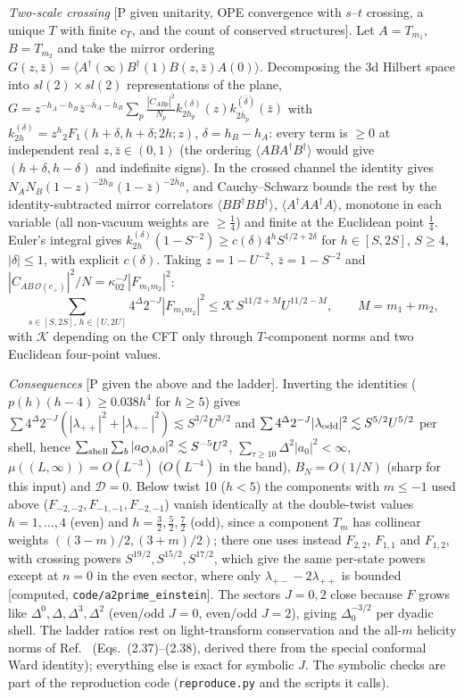 \documentclass[aps,prl,onecolumn,superscriptaddress,nofootinbib]{revtex4-2}
\begin{document}
\emph{Two-scale crossing} [P given unitarity, OPE convergence with $s$--$t$ crossing, a unique $T$ with finite $c_T$, and
the count of conserved structures]. Let $A=T_{m_1}$, $B=T_{m_2}$ and take the mirror ordering
$G(z,\bar z)=\langle A^\dagger(\infty)B^\dagger(1)B(z,\bar z)A(0)\rangle$. Decomposing the 3d Hilbert space into
$sl(2)\times sl(2)$ representations of the plane, $G=z^{-h_A-h_B}\bar z^{-\bar h_A-\bar h_B}\sum_p\frac{|C_{ABp}|^2}{N_p}
k^{(\delta)}_{2h_p}(z)k^{(\bar\delta)}_{2\bar h_p}(\bar z)$ with $k^{(\delta)}_{2h}=z^h{}_2F_1(h+\delta,h+\delta;2h;z)$,
$\delta=h_B-h_A$: every term is $\ge0$ at independent real $z,\bar z\in(0,1)$ (the ordering $\langle ABA^\dagger B^\dagger\rangle$
would give $(h+\delta,h-\delta)$ and indefinite signs). In the crossed channel the identity gives
$N_AN_B(1-z)^{-2h_B}(1-\bar z)^{-2\bar h_B}$, and Cauchy--Schwarz bounds the rest by the identity-subtracted mirror
correlators $\langle BB^\dagger BB^\dagger\rangle$, $\langle A^\dagger AA^\dagger A\rangle$, monotone in each variable
(all non-vacuum weights are $\ge\frac14$) and finite at the Euclidean point $\frac14$. Euler's integral gives
$k^{(\delta)}_{2h}(1-S^{-2})\ge c(\delta)4^hS^{1/2+2\delta}$ for $h\in[S,2S]$, $S\ge4$, $|\delta|\le1$, with explicit
$c(\delta)$. Taking $z=1-U^{-2}$, $\bar z=1-S^{-2}$ and $|C_{AB\,\mathcal O(e_+)}|^2/N=\kappa_02^{-J}|F_{m_1m_2}|^2$:
\[
\sum_{s\in[S,2S],\,h\in[U,2U]}4^\Delta2^{-J}|F_{m_1m_2}|^2\le\mathcal K\,S^{11/2+M}U^{11/2-M},\qquad M=m_1+m_2 ,
\]
with $\mathcal K$ depending on the CFT only through $T$-component norms and two Euclidean four-point values.

\emph{Consequences} [P given the above and the ladder]. Inverting the identities ($p(h)(h-4)\ge0.038h^4$ for $h\ge5$)
gives $\sum4^\Delta2^{-J}(|\lambda_{++}|^2+|\lambda_{+-}|^2)\lesssim S^{3/2}U^{3/2}$ and
$\sum4^\Delta2^{-J}|\lambda_{\rm odd}|^2\lesssim S^{5/2}U^{5/2}$ per shell, hence $\sum_{\rm shell}\sum_b|a_{\mathcal O,b,0}|^2
\lesssim S^{-5}U^2$, $\sum_{\tau\ge10}\Delta^2|a_0|^2<\infty$, $\mu((L,\infty))=O(L^{-3})$ ($O(L^{-4})$ in the band),
$B_N=O(1/N)$ (sharp for this input) and $\mathcal D=0$. Below twist 10 ($h<5$) the components with $m\le-1$ used above ($F_{-2,-2},F_{-1,-1},F_{-2,-1}$) vanish identically at the double-twist values $h=1,\dots,4$ (even) and $h=\tfrac32,\tfrac52,\tfrac72$ (odd), since a component $T_m$ has collinear weights $((3-m)/2,(3+m)/2)$; there one uses instead $F_{2,2}$, $F_{1,1}$ and $F_{1,2}$, with crossing powers $S^{19/2},S^{15/2},S^{17/2}$, which give the same per-state powers except at $n=0$ in the even sector, where only $\lambda_{+-}-2\lambda_{++}$ is bounded [computed, \texttt{code/a2prime\_einstein}]. The sectors $J=0,2$ close because $F$ grows like $\Delta^0,\Delta,
\Delta^3,\Delta^2$ (even/odd $J=0$, even/odd $J=2$), giving $\Delta_0^{-3/2}$ per dyadic shell. The ladder ratios rest on
light-transform conservation and the all-$m$ helicity norms of Ref.~\cite{GilliozSpinors} (Eqs.~(2.37)--(2.38), derived there from the
special conformal Ward identity); everything else is exact for symbolic
$J$. The symbolic checks are part of the reproduction code (\texttt{reproduce.py} and the scripts it calls).
\end{document}
